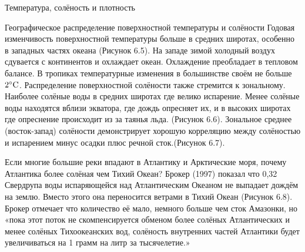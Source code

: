 \begin{chapter}{Температура, солёность и плотность}
\begin{section}{Географическое распределение поверхностной температуры и солёности}
Годовая изменчивость поверхностной температуры больше в средних
широтах, особенно в западных частях океана (Рисунок 6.5). На западе
зимой холодный воздух сдувается с континентов и охлаждает
океан. Охлаждение преобладает в тепловом балансе. В тропиках
температурные изменения в большинстве своём не
больше~${2}^\circ\mbox{C}$. Распределение поверхностной солёности также
стремится к зональному. Наиболее солёные воды в средних широтах где
велико испарение. Менее солёные воды находятся вблизи экватора, где
дождь опресняет их, и в высоких широтах где опреснение происходит из
за таянья льда. (Рисунок 6.6). Зональное среднее (восток-запад)
солёности демонстрирует хорошую корреляцию между солёностью и
испарением минус осадки плюс речной сток.(Рисунок 6.7).
%
%

Если многие большие реки впадают в Атлантику и Арктические моря,
почему Атлантика более солёная чем Тихий Океан? Брокер (1997) показал
что 0,32 Свердрупа воды испаряющейся над Атлантическим Океаном не
выпадает дождём на землю. Вместо этого она переносится ветрами в Тихий
Океан (Рисунок 6.8). Брокер отмечает что количество её мало, немного
больше чем сток Амазонки, но «пока этот поток не скомпенсируется
обменом более солёных Атлантических и менее солёных Тихоокеанских вод,
солёность внутренних частей Атлантики будет увеличиваться на 1 грамм
на литр за тысячелетие.»
%


\end{section}
\end{chapter}
